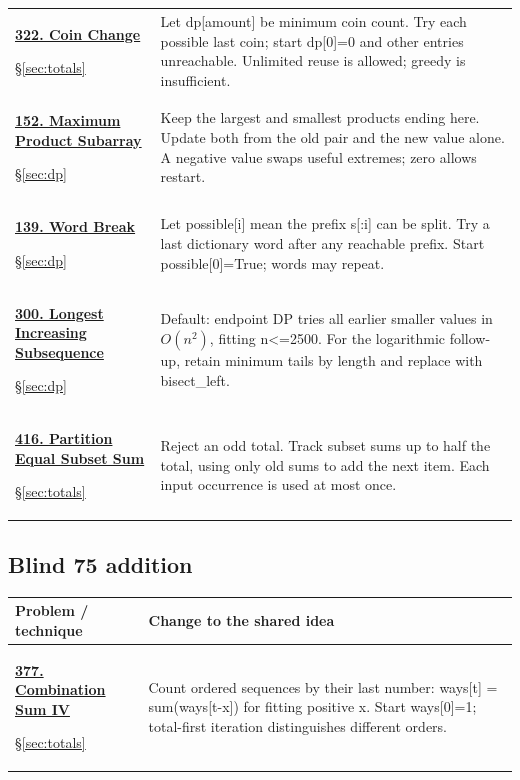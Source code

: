 \documentclass[11pt]{article}
\newcommand{\sect}[1]{\hyperref[sec:#1]{\S\ref*{sec:#1}}}
\begin{document}
\begin{longtable}{@{}L{4.3cm}L{11.7cm}@{}}
\hypertarget{lc322}{}\href{https://leetcode.com/problems/coin-change/}{\textbf{322. Coin Change}}\par\sect{totals} & Let dp[amount] be minimum coin count. Try each possible last coin; start dp[0]=0 and other entries unreachable. Unlimited reuse is allowed; greedy is insufficient.\\[4pt]
\hypertarget{lc152}{}\href{https://leetcode.com/problems/maximum-product-subarray/}{\textbf{152. Maximum Product Subarray}}\par\sect{dp} & Keep the largest and smallest products ending here. Update both from the old pair and the new value alone. A negative value swaps useful extremes; zero allows restart.\\[4pt]
\hypertarget{lc139}{}\href{https://leetcode.com/problems/word-break/}{\textbf{139. Word Break}}\par\sect{dp} & Let possible[i] mean the prefix s[:i] can be split. Try a last dictionary word after any reachable prefix. Start possible[0]=True; words may repeat.\\[4pt]
\hypertarget{lc300}{}\href{https://leetcode.com/problems/longest-increasing-subsequence/}{\textbf{300. Longest Increasing Subsequence}}\par\sect{dp} & Default: endpoint DP tries all earlier smaller values in \(O(n^2)\), fitting n<=2500. For the logarithmic follow-up, retain minimum tails by length and replace with bisect\_left.\\[4pt]
\hypertarget{lc416}{}\href{https://leetcode.com/problems/partition-equal-subset-sum/}{\textbf{416. Partition Equal Subset Sum}}\par\sect{totals} & Reject an odd total. Track subset sums up to half the total, using only old sums to add the next item. Each input occurrence is used at most once.\\[4pt]
\bottomrule
\end{longtable}
\subsection{Blind 75 addition}
\begin{longtable}{@{}L{4.3cm}L{11.7cm}@{}}
\toprule Problem / technique & Change to the shared idea \\ \midrule\endhead
\hypertarget{lc377}{}\href{https://leetcode.com/problems/combination-sum-iv/}{\textbf{377. Combination Sum IV}}\par\sect{totals} & Count ordered sequences by their last number: ways[t] = sum(ways[t-x]) for fitting positive x. Start ways[0]=1; total-first iteration distinguishes different orders.\\[4pt]
\bottomrule
\end{longtable}
\end{document}
